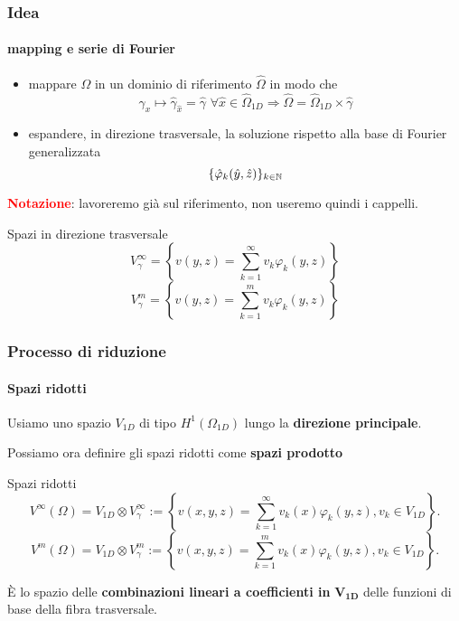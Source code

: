  \begin{frame}
 \frametitle{Idea}
 \framesubtitle{mapping e serie di Fourier}
 \begin{itemize}
  \item mappare $\Omega$ in un dominio di riferimento $\widehat \Omega$ in modo che 
  $$\gamma_x\mapsto\hat \gamma_{\hat x}=\hat \gamma\,\,\forall \hat x\in\widehat\Omega_{1D}\Longrightarrow\widehat\Omega=\widehat\Omega_{1D}\times\hat\gamma$$
  \item espandere, in direzione trasversale, la soluzione rispetto alla base di Fourier generalizzata 
  $$\{\hat\varphi_k(\hat y,\hat z)\}_{k\in\mathbb{N}}$$
 \end{itemize}
 \textcolor{red}{\footnotesize\textbf{Notazione}}{\footnotesize: lavoreremo gi\`a sul riferimento, non useremo quindi i cappelli.}
 \begin{block}{Spazi in direzione trasversale}
 \footnotesize
  $$V^\infty_\gamma=\left\{v(y,z)=\sum_{k=1}^\infty v_k\varphi_k(y,z)\right\}$$
  $$V^m_\gamma=\left\{v(y,z)=\sum_{k=1}^m v_k\varphi_k(y,z)\right\}$$
 \end{block}
 \end{frame}
\begin{frame}
 \frametitle{Processo di riduzione}
 \framesubtitle{Spazi ridotti}
 Usiamo uno spazio $V_{1D}$ di tipo $H^1(\Omega_{1D})$ lungo la \textbf{direzione principale}.
 
 Possiamo ora definire gli spazi ridotti come \textbf{spazi prodotto}
 \begin{exampleblock}{Spazi ridotti}
 {\footnotesize
  $$V^\infty(\Omega)=V_{1D}\otimes V^\infty_\gamma:=\left\{v(x,y,z)=\sum_{k=1}^\infty v_k(x)\varphi_k(y,z), v_k\in V_{1D}\right\}.$$
  $$V^m(\Omega)=V_{1D}\otimes V^m_\gamma:=\left\{v(x,y,z)=\sum_{k=1}^m v_k(x)\varphi_k(y,z), v_k\in V_{1D}\right\}.$$
  }
  
  \`E lo spazio delle \textbf{combinazioni lineari a coefficienti in} $\mathbf{V_{1D}}$ delle funzioni di base della fibra trasversale.
  \end{exampleblock}
\end{frame}

